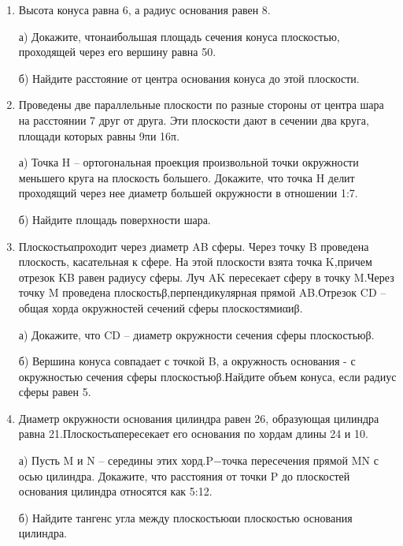 \documentclass[12pt]{article}
\begin{document}
\begin{enumerate}
  \item Высота конуса равна 6, а радиус основания равен 8.
  \par а) Докажите, чтонаибольшая площадь сечения конуса плоскостью, проходящей через его вершину равна 50.
  \par б) Найдите расстояние от центра основания конуса до этой плоскости.
  \item Проведены две параллельные плоскости по разные стороны от центра шара на расстоянии 7 друг от друга. Эти плоскости дают в сечении два круга, площади которых равны 9πи 16π.
  \par а) Точка H – ортогональная проекция произвольной точки окружности меньшего круга на плоскость большего. Докажите, что точка H делит проходящий через нее диаметр большей окружности в отношении 1:7.
  \par б) Найдите площадь поверхности шара.
  \item Плоскостьαпроходит через диаметр AB сферы. Через точку B проведена плоскость, касательная к сфере. На этой плоскости взята точка K,причем отрезок KB равен радиусу сферы. Луч AK пересекает сферу в точку M.Через точку M проведена плоскостьβ,перпендикулярная прямой AB.Отрезок CD – общая хорда окружностей сечений сферы плоскостямиαиβ.
  \par а) Докажите, что CD – диаметр окружности сечения сферы плоскостьюβ.
  \par б) Вершина конуса совпадает с точкой B, а окружность основания - с окружностью сечения сферы плоскостьюβ.Найдите объем конуса, если радиус сферы равен 5.
  \item Диаметр окружности основания цилиндра равен 26, образующая цилиндра равна 21.Плоскостьαпересекает его основания по хордам длины 24 и 10.
  \par а) Пусть M и N – середины этих хорд.P−точка пересечения прямой MN с осью цилиндра. Докажите, что расстояния от точки P до плоскостей основания цилиндра относятся как 5:12.
  \par б) Найдите тангенс угла между плоскостьюαи плоскостью основания цилиндра.
\end{enumerate}
\end{document}
